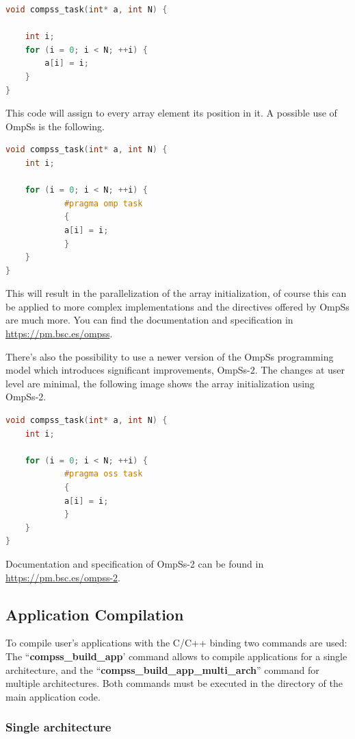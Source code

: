 \begin{lstlisting}[language=C++]
void compss_task(int* a, int N) {

    int i;
    for (i = 0; i < N; ++i) {
    	a[i] = i;
    }
}
\end{lstlisting}

This code will assign to every array element its position in it. A possible use of OmpSs is the following.

\begin{lstlisting}[language=C++]
void compss_task(int* a, int N) {
    int i;

    for (i = 0; i < N; ++i) {
			#pragma omp task
			{
    		a[i] = i;
			}
    }
}
\end{lstlisting}

This will result in the parallelization of the array initialization, of course this can be applied to more complex implementations and the directives offered by OmpSs are much more. You can find the documentation and specification in \url{https://pm.bsc.es/ompss}.
\par\bigskip
There's also the possibility to use a newer version of the OmpSs programming model which introduces significant improvements, OmpSs-2. The changes at user level are minimal, the following image shows the array initialization using OmpSs-2.

\begin{lstlisting}[language=C++]
void compss_task(int* a, int N) {
    int i;

    for (i = 0; i < N; ++i) {
			#pragma oss task
			{
    		a[i] = i;
			}
    }
}
\end{lstlisting}

Documentation and specification of OmpSs-2 can be found in \url{https://pm.bsc.es/ompss-2}.

\subsection{Application Compilation}

To compile user's applications with the C/C++ binding two commands are used: The ``{\bf compss\_build\_app}' command allows to compile applications for a single architecture, and the ``{\bf compss\_build\_app\_multi\_arch}'' command for multiple architectures. Both commands must be executed in the directory of the main application code. 

\subsubsection{Single architecture}

